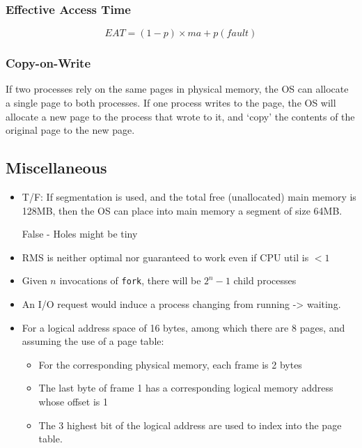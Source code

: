 \documentclass[a4paper]{article}
\begin{document}
\begin{multicols*}{2}
    \subsubsection*{Effective Access Time}
    \begin{equation*}
        EAT = (1 - p) \times ma + p(fault)
    \end{equation*}
    \subsubsection*{Copy-on-Write}
    If two processes rely on the same pages in physical memory, the OS can
    allocate a single page to both processes. If one process writes to the page,
    the OS will allocate a new page to the process that wrote to it, and `copy'
    the contents of the original page to the new page.

    \subsection*{Miscellaneous}
    \begin{itemize}
        \item T/F: If segmentation is used, and the total free (unallocated) main memory is
              128MB, then the OS can place into main memory a segment of size 64MB.

              False - Holes might be tiny

        \item RMS is neither optimal nor guaranteed to work even if CPU util is \(< 1\)
        \item Given \(n\) invocations of \texttt{fork}, there will be \(2^n - 1\) child
              processes
        \item An I/O request would induce a process changing from running -> waiting.
        \item For a logical address space of 16 bytes, among which there are 8 pages, and
              assuming the use of a page table:

              \begin{itemize}
                  \item For the corresponding physical memory, each frame is 2 bytes
                  \item The last byte of frame 1 has a corresponding logical memory address whose offset is 1
                  \item The 3 highest bit of the logical address are used to index into the page table.
              \end{itemize}


\end{itemize}
\end{multicols*}
\end{document}
